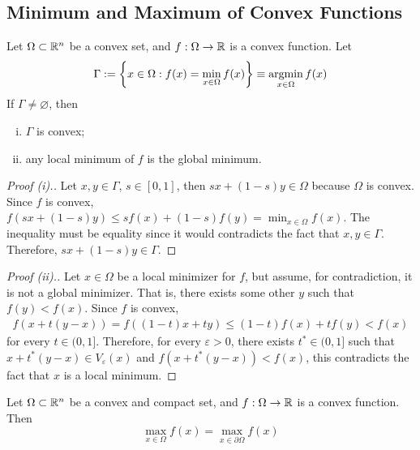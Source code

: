 \documentclass{article}
\begin{document}
    \subsection{Minimum and Maximum of Convex Functions}
    \begin{theorem}
        Let $\Omega \subset \mathbb{R}^n$ be a convex set, and $f: \Omega \to \mathbb{R}$ is a convex function. Let
        \begin{align}
        	\Gamma := \left\{x \in \Omega: f(x) = \min_{x \in \Omega} f(x) \right\} \equiv \operatorname*{argmin}_{x \in \Omega} f(x)
        \end{align}
        If $\Gamma \neq \varnothing$, then 
        \begin{enumerate}[(i)]
        	\item $\Gamma$ is convex;
        	\item any local minimum of $f$ is the global minimum.
        \end{enumerate}
    \end{theorem}
    
    \begin{proof}[Proof (i).]
    	Let $x, y \in \Gamma$, $s \in [0, 1]$, then $sx+(1-s)y \in \Omega$ because $\Omega$ is convex. Since $f$ is convex, $f(sx+(1-s)y) \leq sf(x) + (1-s)f(y) = \min_{x \in \Omega} f(x)$. The inequality must be equality since it would contradicts the fact that $x, y \in \Gamma$. Therefore, $sx+(1-s)y \in \Gamma$.
    \end{proof}
    
    \begin{proof}[Proof (ii).]
    	Let $x \in \Omega$ be a local minimizer for $f$, but assume, for contradiction, it is not a global minimizer. That is, there exists some other $y$ such that $f(y) < f(x)$. Since $f$ is convex, \begin{align}
 				f(x + t(y-x)) = f((1-t)x + ty) \leq (1-t)f(x) + tf(y) < f(x)
			\end{align}
			for every $t \in (0, 1]$. Therefore, for every $\varepsilon > 0$, there exists $t^* \in (0, 1]$ such that $x + t^*(y-x) \in V_\varepsilon(x)$ and $f(x + t^*(y-x)) < f(x)$, this contradicts the fact that $x$ is a local minimum.
    \end{proof}
    
    \begin{theorem}
        Let $\Omega \subset \mathbb{R}^n$ be a convex and compact  set, and $f: \Omega \to \mathbb{R}$ is a convex function. Then 
        \begin{equation}
            \max_{x \in \Omega} f(x) = \max_{x \in \partial \Omega} f(x)
        \end{equation}
    \end{theorem}
    
\end{document}
